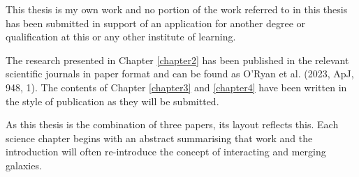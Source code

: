 


\begin{declaration}        %

This thesis is my own work and no portion of the work referred to in this thesis has been submitted in support of an application for another degree or qualification at this or any other institute of learning.

The research presented in Chapter \ref{chapter2} has been published in the relevant scientific journals in paper format and can be found as O'Ryan et al. (2023, ApJ, 948, 1). The contents of Chapter \ref{chapter3} and \ref{chapter4} have been written in the style of publication as they will be submitted.

As this thesis is the combination of three papers, its layout reflects this. Each science chapter begins with an abstract summarising that work and the introduction will often re-introduce the concept of interacting and merging galaxies. 

\end{declaration}


